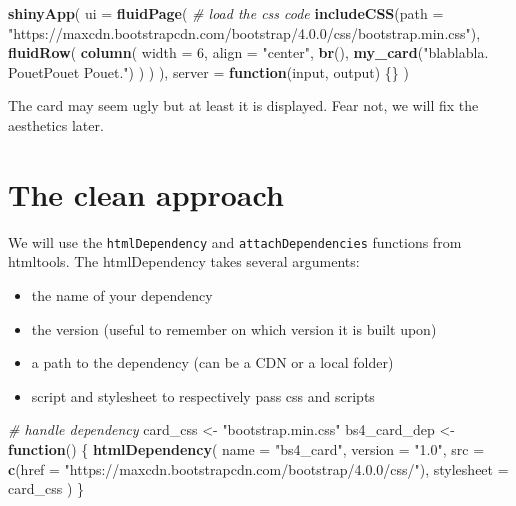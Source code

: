 \documentclass[
]{book}
\newenvironment{Shaded}{\begin{snugshade}}{\end{snugshade}}
\newcommand{\CommentTok}[1]{\textcolor[rgb]{0.56,0.35,0.01}{\textit{#1}}}
\newcommand{\ControlFlowTok}[1]{\textcolor[rgb]{0.13,0.29,0.53}{\textbf{#1}}}
\newcommand{\DataTypeTok}[1]{\textcolor[rgb]{0.13,0.29,0.53}{#1}}
\newcommand{\DecValTok}[1]{\textcolor[rgb]{0.00,0.00,0.81}{#1}}
\newcommand{\KeywordTok}[1]{\textcolor[rgb]{0.13,0.29,0.53}{\textbf{#1}}}
\newcommand{\NormalTok}[1]{#1}
\newcommand{\StringTok}[1]{\textcolor[rgb]{0.31,0.60,0.02}{#1}}
\providecommand{\tightlist}{%
  \setlength{\itemsep}{0pt}\setlength{\parskip}{0pt}}
\begin{document}
\begin{Shaded}
\begin{Highlighting}[]
\KeywordTok{shinyApp}\NormalTok{(}
  \DataTypeTok{ui =} \KeywordTok{fluidPage}\NormalTok{(}
    \CommentTok{# load the css code}
    \KeywordTok{includeCSS}\NormalTok{(}\DataTypeTok{path =} \StringTok{"https://maxcdn.bootstrapcdn.com/bootstrap/4.0.0/css/bootstrap.min.css"}\NormalTok{),}
    \KeywordTok{fluidRow}\NormalTok{(}
      \KeywordTok{column}\NormalTok{(}
        \DataTypeTok{width =} \DecValTok{6}\NormalTok{,}
        \DataTypeTok{align =} \StringTok{"center"}\NormalTok{,}
        \KeywordTok{br}\NormalTok{(),}
        \KeywordTok{my_card}\NormalTok{(}\StringTok{"blablabla. PouetPouet Pouet."}\NormalTok{)}
\NormalTok{      )}
\NormalTok{    )}
\NormalTok{  ),}
  \DataTypeTok{server =} \ControlFlowTok{function}\NormalTok{(input, output) \{\}}
\NormalTok{)}
\end{Highlighting}
\end{Shaded}

The card may seem ugly but at least it is displayed. Fear not, we will fix the aesthetics later.

\hypertarget{the-clean-approach}{%
\section{The clean approach}\label{the-clean-approach}}

We will use the \texttt{htmlDependency} and \texttt{attachDependencies} functions from htmltools.
The htmlDependency takes several arguments:

\begin{itemize}
\tightlist
\item
  the name of your dependency
\item
  the version (useful to remember on which version it is built upon)
\item
  a path to the dependency (can be a CDN or a local folder)
\item
  script and stylesheet to respectively pass css and scripts
\end{itemize}

\begin{Shaded}
\begin{Highlighting}[]
\CommentTok{# handle dependency}
\NormalTok{card_css <-}\StringTok{ "bootstrap.min.css"}
\NormalTok{bs4_card_dep <-}\StringTok{ }\ControlFlowTok{function}\NormalTok{() \{}
  \KeywordTok{htmlDependency}\NormalTok{(}
    \DataTypeTok{name =} \StringTok{"bs4_card"}\NormalTok{,}
    \DataTypeTok{version =} \StringTok{"1.0"}\NormalTok{,}
    \DataTypeTok{src =} \KeywordTok{c}\NormalTok{(}\DataTypeTok{href =} \StringTok{"https://maxcdn.bootstrapcdn.com/bootstrap/4.0.0/css/"}\NormalTok{),}
    \DataTypeTok{stylesheet =}\NormalTok{ card_css}
\NormalTok{  )}
\NormalTok{\}}
\end{Highlighting}
\end{Shaded}
\end{document}
